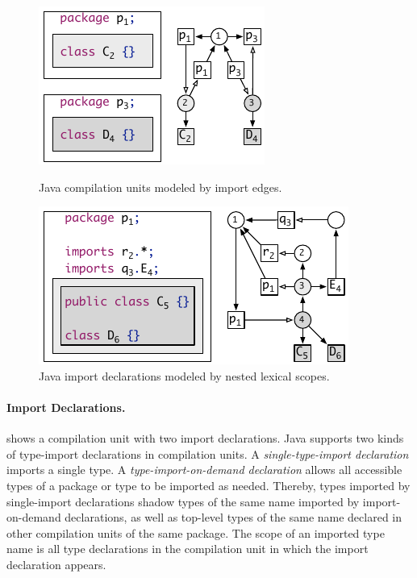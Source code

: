 \begin{figure}[t]
\begin{minipage}{0.42\textwidth}
\begin{boxedminipage}{\hsize}
\centering\includegraphics{figures/scope-graphs/java/units.pdf}
\end{boxedminipage}
\caption{Java compilation units modeled by import edges.}
\end{minipage}
\hfill
\begin{minipage}{0.56\textwidth}
\begin{boxedminipage}{\hsize}
\centering\includegraphics{figures/scope-graphs/java/imports.pdf}
\end{boxedminipage}
\caption{Java import declarations modeled by nested lexical scopes.}
\end{minipage}
\end{figure}

\paragraph{Import Declarations.}

 shows a compilation unit with two import declarations.
Java supports two kinds of type-import declarations in compilation units.
A \emph{single-type-import declaration} 
  imports a single type.
A \emph{type-import-on-demand declaration} 
  allows all accessible types of a package or type to be imported as needed. 
Thereby, types imported by single-import declarations shadow 
  types of the same name imported by import-on-demand declarations, 
  as well as top-level types of the same name declared in other compilation units of the same package.
The scope of an imported type name is all type declarations in the compilation unit in which the import declaration appears.


